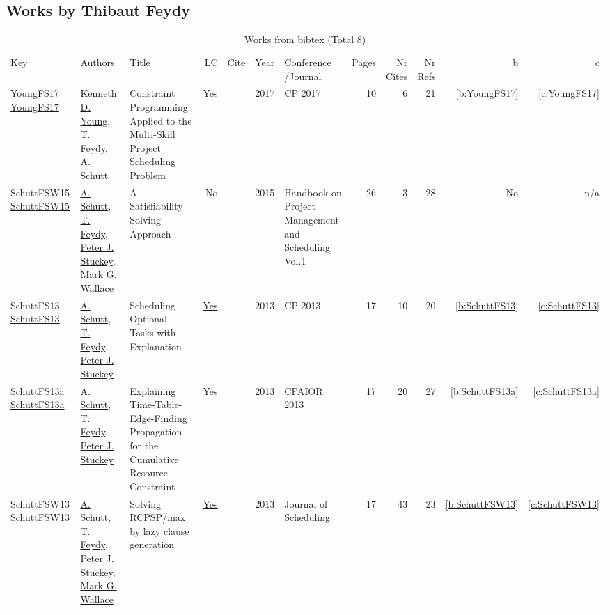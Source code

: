 \subsection{Works by Thibaut Feydy}
\label{sec:a155}
{\scriptsize
\begin{longtable}{>{\raggedright\arraybackslash}p{3cm}>{\raggedright\arraybackslash}p{6cm}>{\raggedright\arraybackslash}p{6.5cm}rrrp{2.5cm}rrrrr}
\rowcolor{white}\caption{Works from bibtex (Total 8)}\\ \toprule
\rowcolor{white}Key & Authors & Title & LC & Cite & Year & \shortstack{Conference\\/Journal} & Pages & \shortstack{Nr\\Cites} & \shortstack{Nr\\Refs} & b & c \\ \midrule\endhead
\bottomrule
\endfoot
YoungFS17 \href{https://doi.org/10.1007/978-3-319-66158-2\_20}{YoungFS17} & \hyperref[auth:a194]{Kenneth D. Young}, \hyperref[auth:a155]{T. Feydy}, \hyperref[auth:a125]{A. Schutt} & Constraint Programming Applied to the Multi-Skill Project Scheduling Problem & \href{works/YoungFS17.pdf}{Yes} & \cite{YoungFS17} & 2017 & CP 2017 & 10 & 6 & 21 & \ref{b:YoungFS17} & \ref{c:YoungFS17}\\
SchuttFSW15 \href{https://doi.org/10.1007/978-3-319-05443-8_7}{SchuttFSW15} & \hyperref[auth:a125]{A. Schutt}, \hyperref[auth:a155]{T. Feydy}, \hyperref[auth:a126]{Peter J. Stuckey}, \hyperref[auth:a156]{Mark G. Wallace} & A Satisfiability Solving Approach & No & \cite{SchuttFSW15} & 2015 & Handbook on Project Management and Scheduling Vol.1 & 26 & 3 & 28 & No & n/a\\
SchuttFS13 \href{https://doi.org/10.1007/978-3-642-40627-0\_47}{SchuttFS13} & \hyperref[auth:a125]{A. Schutt}, \hyperref[auth:a155]{T. Feydy}, \hyperref[auth:a126]{Peter J. Stuckey} & Scheduling Optional Tasks with Explanation & \href{works/SchuttFS13.pdf}{Yes} & \cite{SchuttFS13} & 2013 & CP 2013 & 17 & 10 & 20 & \ref{b:SchuttFS13} & \ref{c:SchuttFS13}\\
SchuttFS13a \href{https://doi.org/10.1007/978-3-642-38171-3\_16}{SchuttFS13a} & \hyperref[auth:a125]{A. Schutt}, \hyperref[auth:a155]{T. Feydy}, \hyperref[auth:a126]{Peter J. Stuckey} & Explaining Time-Table-Edge-Finding Propagation for the Cumulative Resource Constraint & \href{works/SchuttFS13a.pdf}{Yes} & \cite{SchuttFS13a} & 2013 & CPAIOR 2013 & 17 & 20 & 27 & \ref{b:SchuttFS13a} & \ref{c:SchuttFS13a}\\
SchuttFSW13 \href{https://doi.org/10.1007/s10951-012-0285-x}{SchuttFSW13} & \hyperref[auth:a125]{A. Schutt}, \hyperref[auth:a155]{T. Feydy}, \hyperref[auth:a126]{Peter J. Stuckey}, \hyperref[auth:a156]{Mark G. Wallace} & Solving RCPSP/max by lazy clause generation & \href{works/SchuttFSW13.pdf}{Yes} & \cite{SchuttFSW13} & 2013 & Journal of Scheduling & 17 & 43 & 23 & \ref{b:SchuttFSW13} & \ref{c:SchuttFSW13}\\

\end{longtable}}
